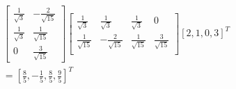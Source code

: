\documentclass[12pt]{article}
\begin{document}
\begin{flushleft}
\begin{align}
\begin{bmatrix}
            \frac{1}{\sqrt{3}} & -\frac{2}{\sqrt{15}} \\
            \frac{1}{\sqrt{3}} & \frac{1}{\sqrt{15}}  \\
            0                  & \frac{3}{\sqrt{15}}
        \end{bmatrix}\begin{bmatrix}
                         \frac{1}{\sqrt{3}}  & \frac{1}{\sqrt{3}}   & \frac{1}{\sqrt{3}}  & 0                   \\
                         \frac{1}{\sqrt{15}} & -\frac{2}{\sqrt{15}} & \frac{1}{\sqrt{15}} & \frac{3}{\sqrt{15}} \\
                     \end{bmatrix}[2, 1, 0, 3]^{T} \\
        = [\frac{8}{5}, -\frac{1}{5}, \frac{8}{5}, \frac{9}{5}]^{T}
    \end{align}

\end{flushleft}
\end{document}
